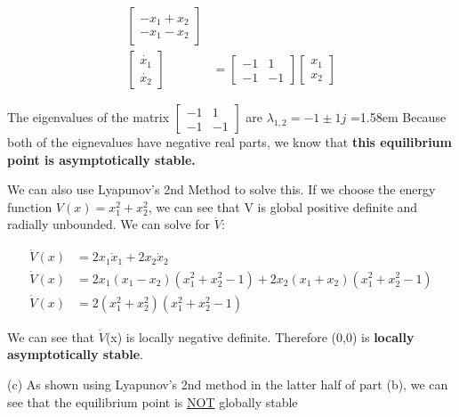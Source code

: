 \documentclass{article}
\begin{document}
\begin{align*}
\begin{bmatrix}
      -x_1 + x_2 \\
      -x_1 - x_2
    \end{bmatrix} \\
    \begin{bmatrix}
      \dot{x_1} \\
      \dot{x_2}
    \end{bmatrix} &=
    \begin{bmatrix}
     -1 & 1 \\
     -1 & -1
    \end{bmatrix} 
    \begin{bmatrix}
      x_1 \\
      x_2
    \end{bmatrix} 
   \end{align*}

  The eigenvalues of the matrix $\begin{bmatrix}
      -1 & 1 \\
      -1&  -1
  \end{bmatrix}$ are $\lambda_{1,2} = -1 \pm 1j$
  \newline
  \hangindent=1.58em
   Because both of the eignevalues have negative real parts, we know that \textbf{this
  equilibrium point is asymptotically stable.} \newline \newline

  We can also use Lyapunov's 2nd Method to solve this. If we choose the energy function
  $V(x)=x_1^2+x_2^2$, we can see that V is global positive definite and radially
  unbounded. We can solve for $\dot{V}$:

  \begin{align*}
    \dot{V}(x) &= 2x_1\dot{x}_1 + 2x_2\dot{x}_2 \\
    \dot{V}(x) &= 2x_1(x_1 - x_2)(x_1^2 + x_2^2 -1) + 2x_2(x_1 + x_2)(x_1^2 + x_2^2 -1) \\
    \dot{V}(x) &= 2(x_1^2 + x_2^2)(x_1^2 +x_2^2 - 1)
  \end{align*}

  We can see that $\dot{V}$(x) is locally negative definite. Therefore (0,0) is
  \textbf{locally asymptotically stable}. \newline \newline

  (c) As shown using Lyapunov's 2nd method in the latter half of part (b), we
  can see that the equilibrium point is \underline{NOT} globally stable

  \newpage
\end{document}
